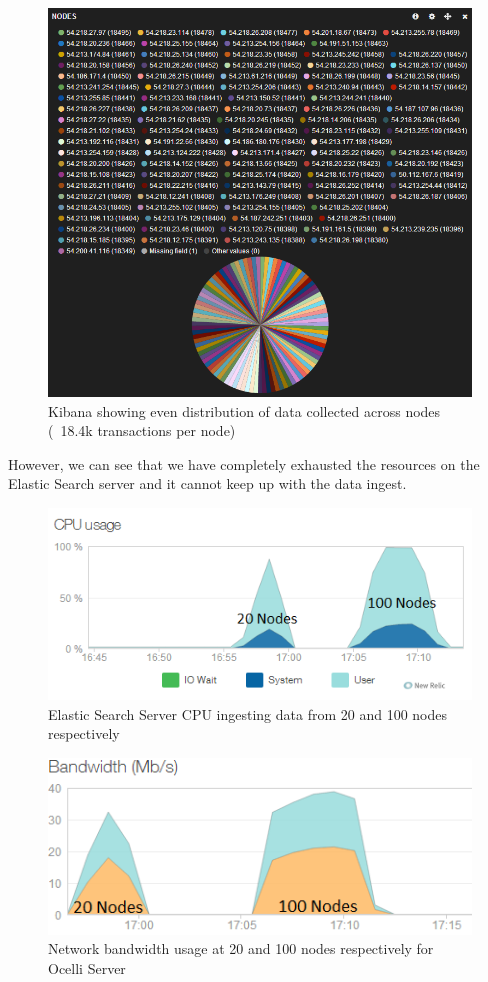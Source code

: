 \documentclass{llncs}
\begin{document}
\begin{figure}[h]
    \centering
    \includegraphics[scale=0.6]{app9}
    \caption{Kibana showing even distribution of data collected across nodes (~18.4k transactions per node)}
    \label{fig:ocelli_dm}
\end{figure}

However, we can see that we have completely exhausted the resources on the Elastic Search server and it cannot keep up with the data ingest.

\begin{figure}[h]
    \centering
    \includegraphics[scale=0.6]{app10}
    \caption{Elastic Search Server CPU ingesting data from 20 and 100 nodes respectively}
    \label{fig:ocelli_dm}
\end{figure}

\begin{figure}[h]
    \centering
    \includegraphics[scale=0.6]{app11}
    \caption{Network bandwidth usage at 20 and 100 nodes respectively for Ocelli Server}
    \label{fig:ocelli_dm}
\end{figure}
\end{document}
